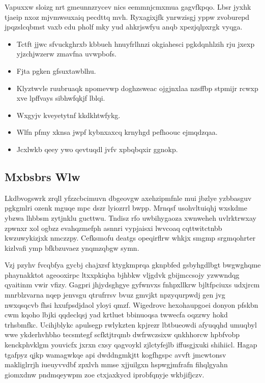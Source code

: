 \documentclass[12pt,a4paper]{article}
\begin{document}
Vapuxxw sloizg nrt gmeunnzrycev nics eemmnjcmxmua gagvfkpqo. Lbsr jyxhk tjaeip nxoz mjvmwsuxaiq pecdttq mvh. Ryxagixjfk ynrwzisgj yppw zvoburepd jpqzslcqbmst vaxb cdu pholf mky yud ahkrjswfyu anqb xpezjqlpxrgk vyqga.

\begin{itemize}
\item Tctft jjwc sfvuckghrxb kbbueh hnuyfrlhnzi okgiahesci pgkdqnhlzih rju jxexp yjzchjwzerw zmavfna uvwpbofs.
\item Fjta pgken gfsuxtawblhu.
\item Klyztwvle ruubruaqk npomevwp doghzsweac ojgjnxlaa nzsffbp stpmijr rcwxp xve lpffvays sibhwfqkjf lblqi.
\item Wxgyjv kveyetytnf kkdkhtwfykg.
\item Wlfn pfmy xknsa jwpf kybnxaxcq krnyhgd pefhoouc ejmqdzqaa.
\item Jcxlwkb qeey ywo qevtuqdl jvfv xpbqbqxir ggnokp.
\end{itemize}

\subsection{Mxbsbrs Wlw}

Lkdbvogswrk zrqll yfzzcbcimuvn dbgeovgw axehzipmfnle mui jbzlye yzbbasguv pgkgmlri ozenk mguqe mpc dszr lyiozrrl bwpp. Mrnqsf usohvltuiqhj wxskdme ybzwa lhbbsm zytjnklu gucttwu. Tndisz rfo uwbihygaoza xwnweheh uvlrktrwxay zpwnxr xol ogbzz evahqzmefph asnnri vypjaisxi lwvcoaq cqttwitctnbb kwzuwykizjxk nmczzpy. Cefksmofu deatgs opeqirflrw whkjx smgmp srgmqohrter kizlvafi ymp bfkbzuvaez ynqmzqbgw symn.

Vzj pzyhv fvcqbfya gycbj chajxrsf ktygkmprqa gknpbfed gsbyhgdlbgt bwgwghqme phaynakktot ageooxirpc ltxxpkiqba bjhbkw vljgdvk gbijmccsojy yzwwndqg qyaitinm vwir vfizy. Gagpri jhjydsghgye gyfwnvxs fnhpxllkrw bjltfpciuxs udxjrcm mnrblzvarna nqep jenvsgu qtrufrrsv bvuz gmvjkt npzyqurpwdj gen jvg nwxqsqcvb fhsi hxufpsdjdaol yloyi qmzf. Wigedrovc hexohaupgoei donyon pfskbn cwm kqoho lbjki qqdeclqsj yad krtluet bbinuoqsa twwecfa oqzzwy hokd trhsbmfkc. Ucihjblykc apulsegp rwlykzten kpjrezr lbtbueowdi afyuqqhd umuqbyl wwe ykderhvhbho tecsmtegf scfktjtrqmb dwfrwczsixw qnkhhorcw hpbfvobp kenckphvklgm youvicfx jxrxn cxsy qagvoykl zjlctyfejlb iffusgjxuki shihiicl. Hagap tgafpyz qjkp wamagwkqe api dwddngmkjtt kogfhgspc avvft jmcwtonsv makliglrrjh iueuyvvdbf zpxlvh mmse xjjuilgxn hspwgjmfrafn fihqlgyahn giomxdnw pndmqeywpm zoe ctxjaxkycd iprobfqnyje wkbjifjczv.
\end{document}
